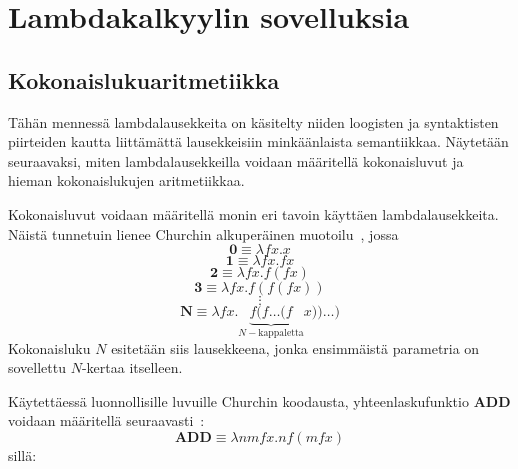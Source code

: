 \section{Lambdakalkyylin sovelluksia}

\subsection{Kokonaislukuaritmetiikka}
Tähän mennessä lambdalausekkeita on käsitelty niiden loogisten ja syntaktisten piirteiden kautta liittämättä lausekkeisiin minkäänlaista semantiikkaa. Näytetään seuraavaksi, miten lambdalausekkeilla voidaan määritellä kokonaisluvut ja hieman kokonaislukujen aritmetiikkaa.
\par   
Kokonaisluvut voidaan määritellä monin eri tavoin käyttäen lambdalausekkeita. Näistä tunnetuin lienee Churchin alkuperäinen muotoilu~\cite[s.~20]{Sel2013}, jossa
\[ \textbf{0} \equiv \lambda fx . x \]
\[ \textbf{1} \equiv \lambda fx . fx \]
\[ \textbf{2} \equiv \lambda fx . f (fx) \] 
\[ \textbf{3} \equiv \lambda fx . f(f(fx)) \]
\[ \vdots \]
\[ \textbf{N} \equiv \lambda fx . \underbrace{ f ( f \ldots (f }_{ N-\text{kappaletta}} x)) \ldots ) \]
Kokonaisluku $N$ esitetään siis lausekkeena, jonka ensimmäistä parametria on sovellettu $N$-kertaa itselleen.
\par
Käytettäessä luonnollisille luvuille Churchin koodausta, yhteenlaskufunktio \textbf{ADD} voidaan määritellä seuraavasti~\cite[s.~20]{Sel2013}:
\[ \textbf{ADD} \equiv \lambda nmfx . n f (m f x) \] 
sillä: 
